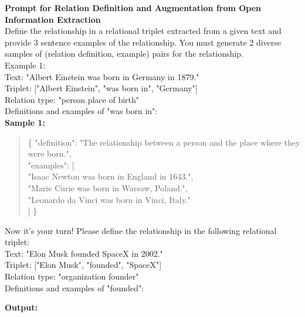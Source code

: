 \begin{table*}[ht]
    \centering
    \begin{mdframed}[linewidth=1pt] %
        \textbf{Prompt for Relation Definition and Augmentation from Open Information Extraction} \\
        \hrulefill
Define the relationship in a relational triplet extracted from a given text and provide 3 sentence examples of the relationship.
You must generate 2 diverse samples of (relation definition, example) pairs for the relationship. \\

Example 1: \\
Text: "Albert Einstein was born in Germany in 1879." \\
Triplet: ["Albert Einstein", "was born in", "Germany"] \\
Relation type: "person place of birth" \\
Definitions and examples of "was born in": \\

\textbf{Sample 1:}  
\begin{quote}
\{
    "definition": "The relationship between a person and the place where they were born.", \\
    "examples": [ \\
    \quad "Isaac Newton was born in England in 1643.", \\
    \quad "Marie Curie was born in Warsaw, Poland.", \\
    \quad "Leonardo da Vinci was born in Vinci, Italy." \\
    ]
\}
\end{quote}

Now it's your turn! Please define the relationship in the following relational triplet: \\
Text: "Elon Musk founded SpaceX in 2002." \\
Triplet: ["Elon Musk", "founded", "SpaceX"] \\
Relation type: "organization founder" \\
Definitions and examples of "founded":
    \end{mdframed}

    \vspace{5pt} %

    \begin{mdframed}[linewidth=1pt] %
        \textbf{Output:} \\
        \hrulefill
        

\end{mdframed}
\end{table*}
